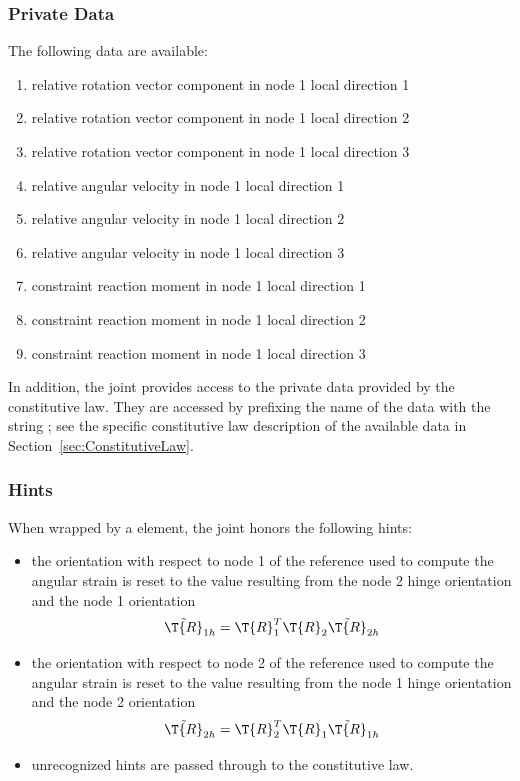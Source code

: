 \subsubsection{Private Data}
The following data are available:
\begin{enumerate}
\item {} relative rotation vector component in node 1 local direction 1
\item {} relative rotation vector component in node 1 local direction 2
\item {} relative rotation vector component in node 1 local direction 3
\item {} relative angular velocity in node 1 local direction 1
\item {} relative angular velocity in node 1 local direction 2
\item {} relative angular velocity in node 1 local direction 3
\item {} constraint reaction moment in node 1 local direction 1
\item {} constraint reaction moment in node 1 local direction 2
\item {} constraint reaction moment in node 1 local direction 3
\end{enumerate}
In addition, the joint provides
access to the private data provided by the constitutive law.
They are accessed by prefixing the name of the data with the string
; see the specific constitutive law
description of the available data in Section~\ref{sec:ConstitutiveLaw}.

\subsubsection{Hints}
When wrapped by a  element, the 
joint honors the following hints:
\begin{itemize}
\item {} the orientation with respect to node 1
of the reference used to compute the angular strain is reset
to the value resulting from the node 2 hinge orientation
and the node 1 orientation
\begin{displaymath}
	\tilde{\T{R}}_{1h} = \T{R}_1^T \T{R}_2 \tilde{\T{R}}_{2h}
\end{displaymath}
\item {} the orientation with respect to node 2
of the reference used to compute the angular strain is reset
to the value resulting from the node 1 hinge orientation
and the node 2 orientation
\begin{displaymath}
	\tilde{\T{R}}_{2h} = \T{R}_2^T \T{R}_1 \tilde{\T{R}}_{1h}
\end{displaymath}
\item unrecognized hints are passed through to the constitutive law.
\end{itemize}

